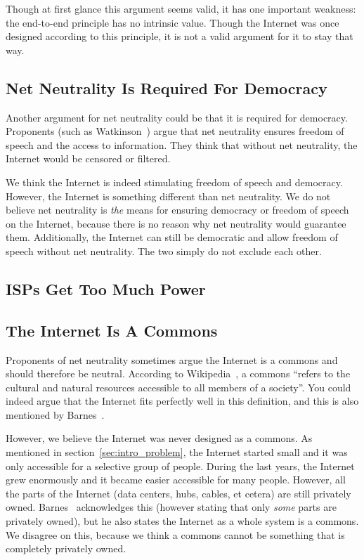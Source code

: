 Though at first glance this argument seems valid, it has one important weakness: the end-to-end principle has no intrinsic value. Though the Internet was once designed according to this principle, it is not a valid argument for it to stay that way.



\subsection{Net Neutrality Is Required For Democracy}
Another argument for net neutrality could be that it is required for democracy.
Proponents (such as Watkinson~\cite{watkinson2012democracy}) argue that net neutrality ensures freedom of speech and the access to information.
They think that without net neutrality, the Internet would be censored or filtered.

We think the Internet is indeed stimulating freedom of speech and democracy.
However, the Internet is something different than net neutrality.
We do not believe net neutrality is \emph{the} means for ensuring democracy or freedom of speech on the Internet, because there is no reason why net neutrality would guarantee them.
Additionally, the Internet can still be democratic and allow freedom of speech without net neutrality.
The two simply do not exclude each other.

\subsection{\acp{ISP} Get Too Much Power}

\subsection{The Internet Is A Commons}
Proponents of net neutrality sometimes argue the Internet is a commons and should therefore be neutral.
According to Wikipedia~\cite{wikipedia2014commons}, a commons ``refers to the cultural and natural resources accessible to all members of a society''.
You could indeed argue that the Internet fits perfectly well in this definition, and this is also mentioned by Barnes~\cite{barnes2003capitalism}.

However, we believe the Internet was never designed as a commons.
As mentioned in section~\ref{sec:intro_problem}, the Internet started small and it was only accessible for a selective group of people.
During the last years, the Internet grew enormously and it became easier accessible for many people.
However, all the parts of the Internet (data centers, hubs, cables, et cetera) are still privately owned.
Barnes~\cite{barnes2003capitalism} acknowledges this (however stating that only \emph{some} parts are privately owned), but he also states the Internet as a whole system is a commons.
We disagree on this, because we think a commons cannot be something that is completely privately owned.